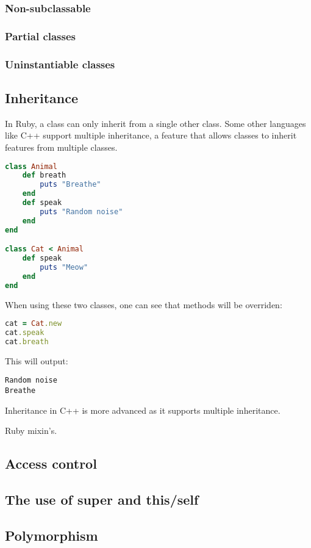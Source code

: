 \documentclass[10pt,a4paper,twocolumn]{article}
\begin{document}
\subsubsection{Non-subclassable}

\subsubsection{Partial classes}

\subsubsection{Uninstantiable classes}

\subsection{Inheritance}
In Ruby, a class can only inherit from a single other class. Some other languages like C++ support multiple inheritance, a feature that allows classes to inherit features from multiple classes.
\begin{lstlisting}[language=Ruby]
class Animal
	def breath
		puts "Breathe"
	end
	def speak
		puts "Random noise"
	end
end

class Cat < Animal
	def speak
		puts "Meow"
	end
end
\end{lstlisting}
When using these two classes, one can see that methods will be overriden:
\begin{lstlisting}[language=Ruby]
cat = Cat.new
cat.speak
cat.breath
\end{lstlisting}
This will output:
\begin{lstlisting}
Random noise
Breathe
\end{lstlisting}
Inheritance in C++ is more advanced as it supports multiple inheritance.

Ruby mixin's.

\subsection{Access control}

\subsection{The use of super and this/self}

\subsection{Polymorphism}
\end{document}
